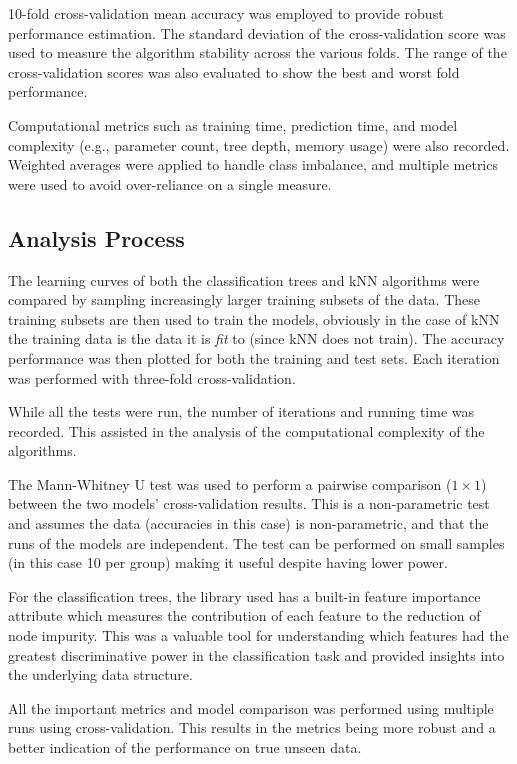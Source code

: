 \documentclass[10pt, conference]{IEEEtran}
\begin{document}
10-fold cross-validation mean accuracy was employed to provide robust performance estimation. The standard deviation of the cross-validation score was used to measure the algorithm stability across the various folds. The range of the cross-validation scores was also evaluated to show the best and worst fold performance. 

Computational metrics such as training time, prediction time, and model complexity (e.g., parameter count, tree depth, memory usage) were also recorded. Weighted averages were applied to handle class imbalance, and multiple metrics were used to avoid over-reliance on a single measure.

\subsection{Analysis Process}



The learning curves of both the classification trees and kNN algorithms were compared by sampling increasingly larger training subsets of the data. These training subsets are then used to train the models, obviously in the case of kNN the training data is the data it is \textit{fit} to (since kNN does not train). The accuracy performance was then plotted for both the training and test sets. Each iteration was performed with three-fold cross-validation.

While all the tests were run, the number of iterations and running time was recorded. This assisted in the analysis of the computational complexity of the algorithms.

The Mann-Whitney U test \cite{mann1947test} was used to perform a pairwise comparison ($1 \times 1$) between the two models' cross-validation results.  This is a non-parametric test and assumes the data (accuracies in this case) is non-parametric, and that the runs of the models are independent. The test can be performed on small samples (in this case 10 per group) making it useful despite having lower power.

For the classification trees, the library used has a built-in feature importance attribute which measures the contribution of each feature to the reduction of node impurity. This was a valuable tool for understanding which features had the greatest discriminative power in the classification task and provided insights into the underlying data structure.

All the important metrics and model comparison was performed using multiple runs using cross-validation. This results in the metrics being more robust and a better indication of the performance on true unseen data.
\end{document}
